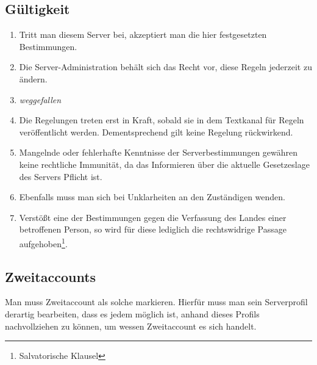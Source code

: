 \documentclass{article}
\begin{document}
\subsection{Gültigkeit}
\begin{enumerate}[(1)]
	\item Tritt man diesem Server bei, akzeptiert man die hier festgesetzten Bestimmungen.
	\item Die Server-Administration behält sich das Recht vor, diese Regeln jederzeit zu ändern.
	\item \textit{weggefallen}
	\item Die Regelungen treten erst in Kraft, sobald sie in dem Textkanal für Regeln veröffentlicht werden. Dementsprechend gilt keine Regelung rückwirkend.
	\item Mangelnde oder fehlerhafte Kenntnisse der Serverbestimmungen gewähren keine rechtliche Immunität, da das Informieren über die aktuelle Gesetzeslage des Servers Pflicht ist.
	\item Ebenfalls muss man sich bei Unklarheiten an den Zuständigen wenden.
	\item Verstößt eine der Bestimmungen gegen die Verfassung des Landes einer betroffenen Person, so wird für diese lediglich die rechtswidrige Passage aufgehoben\footnote{Salvatorische Klausel}.	
\end{enumerate}

\subsection{Zweitaccounts}
Man muss Zweitaccount als solche markieren. Hierfür muss man sein Serverprofil derartig bearbeiten, dass es jedem möglich ist, anhand dieses Profils nachvollziehen zu können, um wessen Zweitaccount es sich handelt.
\end{document}

